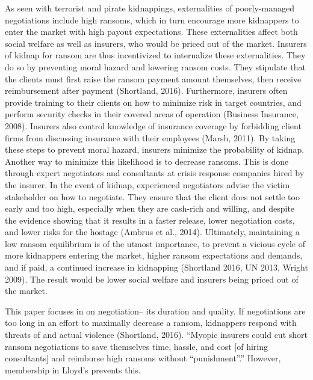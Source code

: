\documentclass[12pt]{article}
\begin{document}
As seen with terrorist and pirate kidnappings, externalities of poorly-managed negotiations include high ransoms, which in turn encourage more kidnappers to enter the market with high payout expectations. These externalities affect both social welfare as well as insurers, who would be priced out of the market. Insurers of kidnap for ransom are thus incentivized to internalize these externalities. They do so by preventing moral hazard and lowering ransom costs. They stipulate that the clients must first raise the ransom payment amount themselves, then receive reimbursement after payment (Shortland, 2016). Furthermore, insurers often provide training to their clients on how to minimize risk in target countries, and perform security checks in their covered areas of operation (Business Insurance, 2008). Insurers also control knowledge of insurance coverage by forbidding client firms from discussing insurance with their employees (Marsh, 2011). By taking these steps to prevent moral hazard, insurers minimize the probability of kidnap. Another way to minimize this likelihood is to decrease ransoms. This is done through expert negotiators and consultants at crisis response companies hired by the insurer. In the event of kidnap, experienced negotiators advise the victim stakeholder on how to negotiate. They ensure that the client does not settle too early and too high, especially when they are cash-rich and willing, and despite the evidence showing that it results in a faster release, lower negotiation costs, and lower risks for the hostage (Ambrus et al., 2014). Ultimately, maintaining a low ransom equilibrium is of the utmost importance, to prevent a vicious cycle of more kidnappers entering the market, higher ransom expectations and demands, and if paid, a continued increase in kidnapping (Shortland 2016, UN 2013, Wright 2009). The result would be lower social welfare and insurers being priced out of the market. 

This paper focuses in on negotiation-- its duration and quality. If negotiations are too long in an effort to maximally decrease a ransom, kidnappers respond with threats of and actual violence (Shortland, 2016). ``Myopic insurers could cut short ransom negotiations to save themselves time, hassle, and cost [of hiring consultants] and reimburse high ransoms without ``punishment''.'' However, membership in Lloyd's prevents this.
\end{document}
